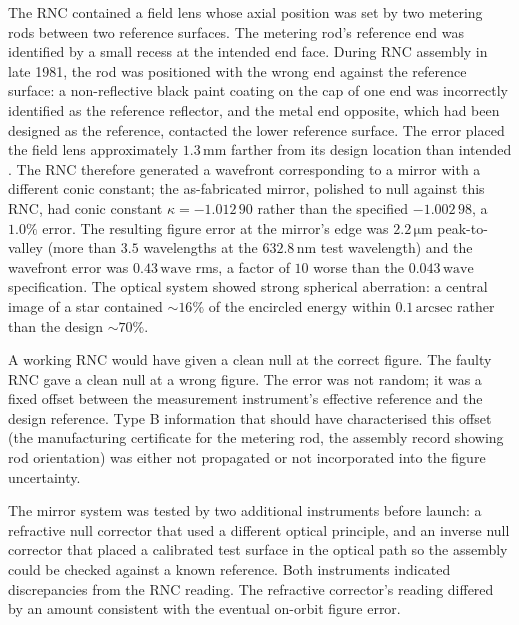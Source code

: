 The RNC contained a field lens whose axial position was set by
two metering rods between two reference surfaces. The metering
rod's reference end was identified by a small recess at the
intended end face. During RNC assembly in late 1981, the rod was
positioned with the wrong end against the reference surface: a
non-reflective black paint coating on the cap of one end was
incorrectly identified as the reference reflector, and the metal
end opposite, which had been designed as the reference,
contacted the lower reference surface. The error placed the field
lens approximately $1.3\,\si{\milli\meter}$ farther from its
design location than intended \cite{acc:nasa-hubble-optical-systems-1990}.
The RNC therefore generated a wavefront corresponding to a
mirror with a different conic constant; the as-fabricated mirror,
polished to null against this RNC, had conic constant
$\kappa = -1.012\,90$ rather than the specified $-1.002\,98$, a
$1.0\%$ error. The resulting figure error at the mirror's edge was
$2.2\,\si{\micro\meter}$ peak-to-valley (more than $3.5$
wavelengths at the $632.8\,\si{\nano\meter}$ test wavelength) and
the wavefront error was $0.43\,\text{wave}$ rms, a factor of $10$
worse than the $0.043\,\text{wave}$ specification. The optical
system showed strong spherical aberration: a central image of a
star contained $\sim 16\%$ of the encircled energy within
$0.1\,\text{arcsec}$ rather than the design $\sim 70\%$.

A working RNC would have given a clean null at the correct figure.
The faulty RNC gave a clean null at a wrong figure. The error was
not random; it was a fixed offset between the measurement
instrument's effective reference and the design reference. Type B
information that should have characterised this offset (the
manufacturing certificate for the metering rod, the assembly
record showing rod orientation) was either not propagated or not
incorporated into the figure uncertainty.

The mirror system was tested by two additional instruments before
launch: a refractive null corrector that used a different optical
principle, and an inverse null corrector that placed a calibrated
test surface in the optical path so the assembly could be checked
against a known reference. Both instruments indicated discrepancies
from the RNC reading. The refractive corrector's reading
differed by an amount consistent with the eventual on-orbit
figure error.

